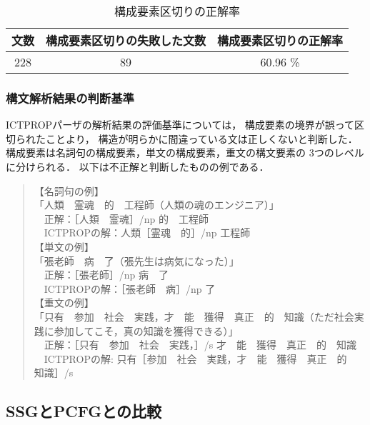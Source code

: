 \documentclass[japanese]{jnlp_1.3a}
\begin{document}
\begin{table}[t]\centering
  \caption{構成要素区切りの正解率}
  \begin{tabular}{|c|c|c|} \hline
文数&構成要素区切りの失敗した文数&構成要素区切りの正解率\\\hline
228&89 &60.96   \%  \\\hline
  \end{tabular}
  \label{tab:resict3}
\end{table}


\subsubsection{構文解析結果の判断基準}

ICTPROPパーザの解析結果の評価基準については，
構成要素の境界が誤って区切られたことより，
構造が明らかに間違っている文は正しくないと判断した．
構成要素は名詞句の構成要素，単文の構成要素，重文の構文要素の
3つのレベルに分けられる．
以下は不正解と判断したものの例である．

\begin{quotation}\noindent
【名詞句の例】\\
 「人類　霊魂　的　工程師（人類の魂のエンジニア）」\\
　正解：［人類　霊魂］/np 的　工程師\\
　ICTPROPの解：人類［霊魂　的］/np 工程師\\
【単文の例】\\
 「張老師　病　了（張先生は病気になった）」\\
　正解：［張老師］/np 病　了\\
　ICTPROPの解：［張老師　病］/np 了\\
【重文の例】\\
「只有　参加　社会　実践，才　能　獲得　真正　的　知識（ただ社会実践に参加してこそ，真の知識を獲得できる）」\\
　正解：［只有　参加　社会　実践，］/s 才　能　獲得　真正　的　知識\\
　ICTPROPの解: 只有［参加　社会　実践，才　能　獲得　真正　的　知識］/s\\
\end{quotation}

\subsection{SSGとPCFGとの比較}
\end{document}
